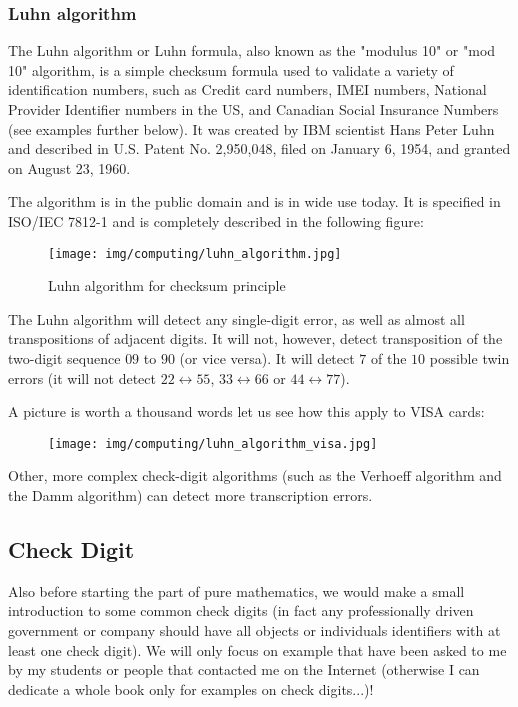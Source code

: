 	\subsubsection{Luhn algorithm}
	The Luhn algorithm or Luhn formula, also known as the "modulus 10" or "mod 10" algorithm, is a simple checksum formula used to validate a variety of identification numbers, such as Credit card numbers, IMEI numbers, National Provider Identifier numbers in the US, and Canadian Social Insurance Numbers (see examples further below). It was created by IBM scientist Hans Peter Luhn and described in U.S. Patent No. 2,950,048, filed on January 6, 1954, and granted on August 23, 1960.

	The algorithm is in the public domain and is in wide use today. It is specified in ISO/IEC 7812-1 and is completely described in the following figure:
	\begin{figure}[H]
		\centering
		\texttt{[image: img/computing/luhn\_algorithm.jpg]}
		\caption{Luhn algorithm for checksum principle}
	\end{figure}
	The Luhn algorithm will detect any single-digit error, as well as almost all transpositions of adjacent digits. It will not, however, detect transposition of the two-digit sequence $09$ to $90$ (or vice versa). It will detect $7$ of the $10$ possible twin errors (it will not detect $22 \leftrightarrow 55$, $33 \leftrightarrow 66$ or $44 \leftrightarrow 77$).
	
	A picture is worth a thousand words let us see how this apply to VISA cards:
	\begin{figure}[H]
		\centering
		\texttt{[image: img/computing/luhn\_algorithm\_visa.jpg]}
	\end{figure}

	Other, more complex check-digit algorithms (such as the Verhoeff algorithm and the Damm algorithm) can detect more transcription errors.
	
	\pagebreak
	\subsection{Check Digit}
	Also before starting the part of pure mathematics, we would make a small introduction to some common check digits (in fact any professionally driven government or company should have all objects or individuals identifiers with at least one check digit). We will only focus on example that have been asked to me by my students or people that contacted me on the Internet (otherwise I can dedicate a whole book only for examples on check digits...)!
	
